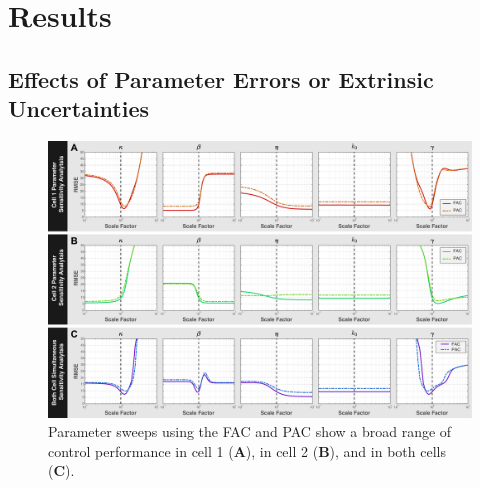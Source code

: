\documentclass[12pt]{article}
\begin{document}

\section{Results}

\subsection{Effects of Parameter Errors or Extrinsic Uncertainties}
\begin{figure}
\begin{center}
\includegraphics[width=1\textwidth]{ParameterPerturbation.pdf}
\caption{Parameter sweeps using the FAC and PAC show a broad range of control performance in cell 1 ({\bf A}),  in cell 2 ({\bf B}), and in both cells ({\bf C}). }
\label{Parameter}
\end{center}
\end{figure}
\end{document}
